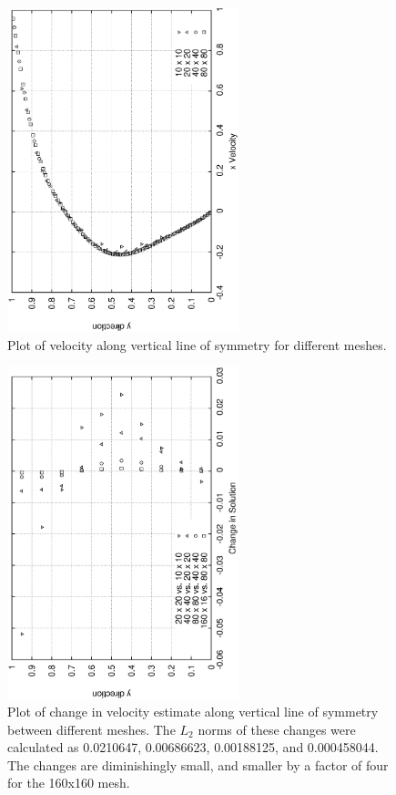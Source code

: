 \documentclass[a4paper, 10pt]{article}
\begin{document}
\begin{enumerate}[I]
    \begin{figure}
      \centering
      \includegraphics[width=0.6\textwidth, angle = -90]{../plot/basic/gci/gci.eps}
      \caption{Plot of velocity along vertical line of symmetry for different meshes.}
      \label{Ugci}
    \end{figure}

    \begin{figure}
      \centering
      \includegraphics[width=0.6\textwidth, angle = -90]{../plot/basic/gci/gci2.eps}
      \caption{Plot of change in velocity estimate along vertical line of symmetry between different meshes. The $L_2$ norms of these changes were calculated as 0.0210647, 0.00686623, 0.00188125, and 0.000458044. The changes are diminishingly small, and smaller by a factor of four for the 160x160 mesh.}
      \label{dUgci}
    \end{figure}

\end{enumerate}
%
\end{document}
